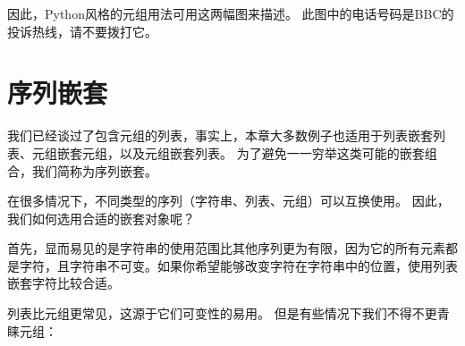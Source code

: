 因此，Python风格的元组用法可用这两幅图来描述。 此图中的电话号码是BBC的投诉热线，请不要拨打它。


\section{序列嵌套}


我们已经谈过了包含元组的列表，事实上，本章大多数例子也适用于列表嵌套列表、元组嵌套元组，以及元组嵌套列表。 为了避免一一穷举这类可能的嵌套组合，我们简称为序列嵌套。


在很多情况下，不同类型的序列（字符串、列表、元组）可以互换使用。 因此，我们如何选用合适的嵌套对象呢？
   


首先，显而易见的是字符串的使用范围比其他序列更为有限，因为它的所有元素都是字符，且字符串不可变。如果你希望能够改变字符在字符串中的位置，使用列表嵌套字符比较合适。


列表比元组更常见，这源于它们可变性的易用。  但是有些情况下我们不得不更青睐元组：


